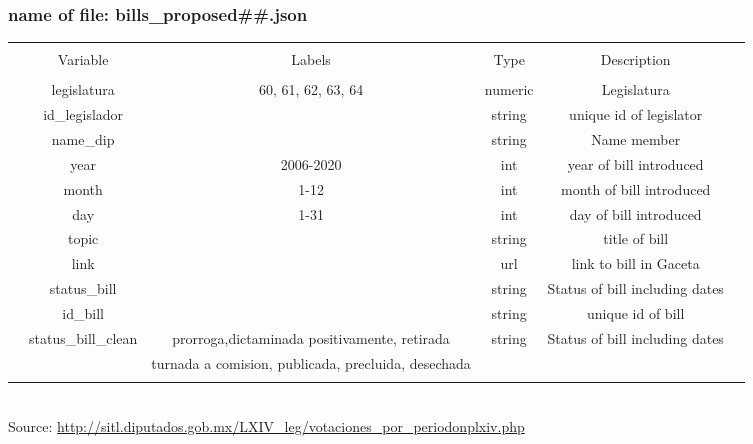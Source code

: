 \documentclass{article}
\begin{document}
\subsubsection*{name of file: bills\_proposed\#\#.json}
\begin{table}[!htbp] \centering 
	\begin{tabular}{@{\extracolsep{5pt}} cccccc} 
		\\[-1.8ex]\hline 
		\hline \\[-1.8ex] 
		& Variable & Labels  & Type & Description \\ 
		\hline \\[-1.8ex] 
		& legislatura  &60, 61, 62, 63, 64 & numeric  & Legislatura   \\ 
		& id\_legislador  &   & string  & unique id of legislator   \\ 
		& name\_dip &   &string & Name member\\
		& year & 2006-2020  &  int & year of bill introduced  \\ 
		& month  & 1-12  & int  & month of bill introduced  \\ 
		& day & 1-31  & int & day of bill introduced \\
		& topic &   & string& title of bill \\
		& link &  & url &link to bill in Gaceta\\
		& status\_bill  & & string& Status of bill including dates \\
		& id\_bill  & & string& unique id of bill \\
		& status\_bill\_clean  & prorroga,dictaminada positivamente, retirada & string& Status of bill including dates \\
		&  &turnada a comision, publicada, precluida, desechada  & & \\
		\hline
		\\[-1.8ex] 
	\end{tabular} 
	\\
	Source:  \url{http://sitl.diputados.gob.mx/LXIV_leg/votaciones_por_periodonplxiv.php}\\
\end{table} 
\end{document}
